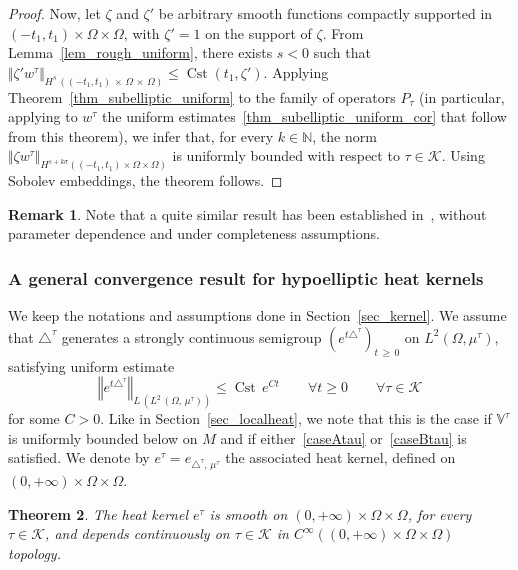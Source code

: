 \documentclass[10pt]{amsart}
\newtheorem{theo}{Theorem}[section]
\theoremstyle{definition}\newtheorem{defi}[theo]{Definition}\newtheorem{rema}[theo]{Remark}\newtheorem{exam}[theo]{Example}\newtheorem{exem}[theo]{Example}\newtheorem{nota}[theo]{Notation}
\newcommand*\N{\mathbb{N}}
\newcommand{\bbV}{\mathbb{V}}
\newcommand{\calK}{\mathcal{K}}
\DeclareMathOperator{\Cst}{Cst}
\renewcommand{\geq}{\geqslant}
\renewcommand{\leq}{\leqslant}
\let\oldforall\forall
\renewcommand*{\forall}{\mathrel{\oldforall}}
\begin{document}
\begin{proof}
Now, let $\zeta$ and $\zeta'$ be arbitrary smooth functions compactly supported in $(-t_1,t_1)\times\Omega\times\Omega$, with $\zeta'=1$ on the support of $\zeta$. From Lemma~\ref{lem_rough_uniform}, there exists $s<0$ such that $\Vert \zeta' w^\tau\Vert_{H^s\,((-t_1,t_1)\,\times\,\Omega\,\times\,\Omega)}\leq \Cst(t_1,\zeta')$. Applying Theorem~\ref{thm_subelliptic_uniform} to the family of operators $P_\tau$ (in particular, applying to $w^\tau$ the uniform estimates~\eqref{thm_subelliptic_uniform_cor} that follow from this theorem), we infer that, for every $k\in\N$, the norm $\Vert \zeta w^\tau\Vert_{H^{s+k\sigma}((-t_1,t_1)\times\Omega\times\Omega)}$ is uniformly bounded with respect to $\tau\in\calK$. Using Sobolev embeddings, the theorem follows.
\end{proof}


\begin{rema}
Note that a quite similar result has been established in~\cite{Hsu1995}, without parameter dependence and under completeness assumptions.
\end{rema}



\subsubsection{A general convergence result for hypoelliptic heat kernels}\label{sec_convergence_heat_kernels}
We keep the notations and assumptions done in Section~\ref{sec_kernel}. We assume that $\triangle^\tau$ generates a strongly continuous semigroup $(e^{t\triangle^\tau})_{t\,\geq\,0}$ on $L^2(\Omega,\mu^\tau)$, satisfying uniform estimate
\[
\left\Vert e^{t\triangle^\tau} \right\Vert_{L\,\left(L^2\,(\Omega,\,\mu^\tau)\right)} \leq \Cst\, e^{C t}\qquad \forall t\geq 0\qquad \forall \tau\in\calK
\]
for some $C>0$. Like in Section~\ref{sec_localheat}, we note that this is the case if $\bbV^\tau$ is uniformly bounded below on $M$ and if either~\ref{caseAtau} or~\ref{caseBtau} is satisfied. We denote by $e^\tau=e_{\triangle^\tau,\,\mu^\tau}$ the associated heat kernel, defined on $(0,+\infty)\times\Omega\times\Omega$.


\begin{theo}\label{thm_CV_general1}
The heat kernel $e^\tau$ is smooth on $(0,+\infty)\times\Omega\times\Omega$, for every $\tau\in\calK$, and depends continuously on $\tau\in\calK$ in $C^\infty((0,+\infty)\times\Omega\times\Omega)$ topology.
\end{theo}
\end{document}
